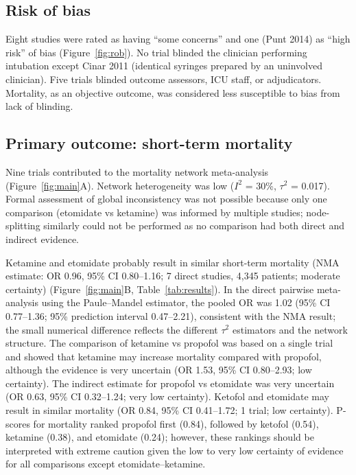 \documentclass[11pt]{article}
\begin{document}
\subsection{Risk of bias}

Eight studies were rated as having ``some concerns'' and one (Punt 2014\cite{punt2014}) as ``high risk'' of bias (Figure~\ref{fig:rob}). No trial blinded the clinician performing intubation except Cinar 2011\cite{cinar2011} (identical syringes prepared by an uninvolved clinician). Five trials blinded outcome assessors, ICU staff, or adjudicators.\cite{jabre2009,knack2023,srivilaithon2023,smischney2019,schmidt2025} Mortality, as an objective outcome, was considered less susceptible to bias from lack of blinding.

\subsection{Primary outcome: short-term mortality}

Nine trials contributed to the mortality network meta-analysis (Figure~\ref{fig:main}A). Network heterogeneity was low ($I^2$ = 30\%, $\tau^2$ = 0.017). Formal assessment of global inconsistency was not possible because only one comparison (etomidate vs ketamine) was informed by multiple studies; node-splitting similarly could not be performed as no comparison had both direct and indirect evidence.

Ketamine and etomidate probably result in similar short-term mortality (NMA estimate: OR 0.96, 95\% CI 0.80--1.16; 7 direct studies, 4,345 patients; moderate certainty) (Figure~\ref{fig:main}B, Table~\ref{tab:results}). In the direct pairwise meta-analysis using the Paule--Mandel estimator, the pooled OR was 1.02 (95\% CI 0.77--1.36; 95\% prediction interval 0.47--2.21), consistent with the NMA result; the small numerical difference reflects the different $\tau^2$ estimators and the network structure. The comparison of ketamine vs propofol was based on a single trial and showed that ketamine may increase mortality compared with propofol, although the evidence is very uncertain (OR 1.53, 95\% CI 0.80--2.93; low certainty). The indirect estimate for propofol vs etomidate was very uncertain (OR 0.63, 95\% CI 0.32--1.24; very low certainty). Ketofol and etomidate may result in similar mortality (OR 0.84, 95\% CI 0.41--1.72; 1 trial; low certainty). P-scores for mortality ranked propofol first (0.84), followed by ketofol (0.54), ketamine (0.38), and etomidate (0.24); however, these rankings should be interpreted with extreme caution given the low to very low certainty of evidence for all comparisons except etomidate--ketamine.
\end{document}
